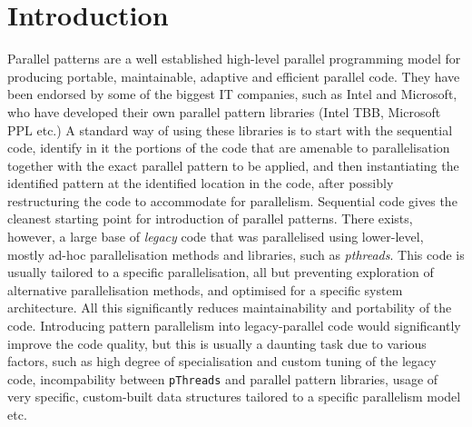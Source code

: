 \section{Introduction}

Parallel patterns are a well established high-level parallel programming model for producing portable, maintainable, adaptive and efficient parallel code. They have been endorsed by some of the biggest IT companies, such as Intel and Microsoft, who have developed their own parallel pattern libraries (Intel TBB, Microsoft PPL etc.) A standard way of using these libraries is to start with the sequential code, identify in it the portions of the code that are amenable to parallelisation together with the exact parallel pattern to be applied, and then instantiating the identified pattern at the identified location in the code, after possibly restructuring the code to accommodate for parallelism. Sequential code gives the cleanest starting point for introduction of parallel patterns. There exists, however, a large base of \emph{legacy} code that was parallelised using lower-level, mostly ad-hoc parallelisation methods and libraries, such as \emph{pthreads}. This code is usually tailored to a specific parallelisation, all but preventing exploration of alternative parallelisation methods, and optimised for a specific system architecture. All this significantly reduces maintainability and portability of the code. %
Introducing pattern parallelism into legacy-parallel code would significantly improve the code quality, but this is usually a daunting task due to various factors, such as high degree of specialisation and custom tuning of the legacy code, incompability between \lstinline{pThreads} and parallel pattern libraries, usage of very specific, custom-built data structures tailored to a specific parallelism model etc.
  
